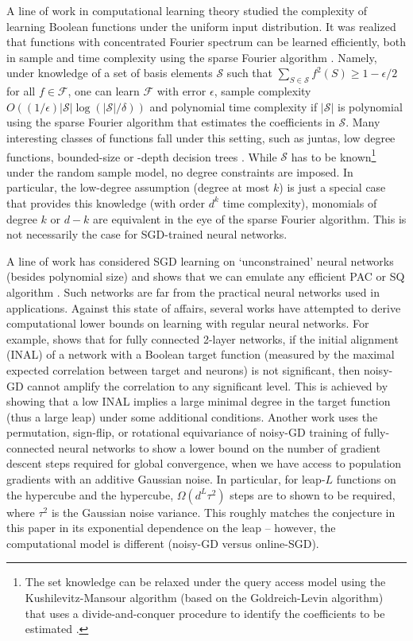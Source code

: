 \documentclass[11pt]{article}
\newcommand{\<}{\langle}
\renewcommand{\>}{\rangle}
\theoremstyle{definition}
\begin{document}
A line of work in computational learning theory studied the complexity of learning Boolean functions under the uniform input distribution. It was realized that functions with concentrated Fourier spectrum can be learned efficiently, both in sample and time complexity using the sparse Fourier algorithm \citep{mansour1994}. Namely, under knowledge of a set of basis elements $\mathcal{S}$ such that $\sum_{S \in \mathcal{S}} f^2(S) \ge 1-\epsilon/2$ for all $f \in \mathcal{F}$, one can learn $\mathcal{F}$ with error $\epsilon$, sample complexity $O((1/\epsilon)|\mathcal{S}|\log (|\mathcal{S}|/\delta))$ and polynomial time complexity if $|\mathcal{S}|$ is polynomial using the sparse Fourier algorithm that estimates the coefficients in $\mathcal{S}$. Many interesting classes of functions fall under this setting, such as juntas, low degree functions, bounded-size or -depth decision trees \citep{odonnell_2014}.  While $\mathcal{S}$ has to be known\footnote{The set knowledge can be relaxed under the query access model using the Kushilevitz-Mansour algorithm (based on the Goldreich-Levin algorithm) that uses a divide-and-conquer procedure to identify the coefficients to be estimated \cite{Kushilevitz-Mansour,GL}.} under the random sample model, no degree constraints are imposed. In particular, the low-degree assumption (degree at most $k$) is just a special case that provides this knowledge (with order $d^k$ time complexity), monomials of degree $k$ or $d-k$ are equivalent in the eye of the sparse Fourier algorithm. This is not necessarily the case for SGD-trained neural networks.




A line of work has considered SGD learning on `unconstrained' neural networks (besides polynomial size) and shows that we can emulate any efficient PAC or SQ algorithm \citep{abbe2020universality,abbe2021power,malach2020implications}. Such networks are far from the practical neural networks used in applications. Against this state of affairs, several works have attempted to derive computational lower bounds on learning with regular neural networks. For example, \cite{inal} shows that for fully connected 2-layer networks, if the initial alignment (INAL) of a network with a Boolean target function     
 (measured by the maximal expected correlation between target and neurons) is not significant, then noisy-GD cannot amplify the correlation to any significant level. This is achieved by showing that a low INAL implies a large minimal degree in the target function (thus a large leap) under some additional conditions. Another work \citep{abbe2022non} uses the permutation, sign-flip, or rotational equivariance of noisy-GD training of fully-connected neural networks to show a lower bound on the number of gradient descent steps required for global convergence, when we have access to population gradients with an additive Gaussian noise. In particular, for leap-$L$ functions on the hypercube and the hypercube, $\Omega (d^{L} \tau^2)$ steps are to shown to be required, where $\tau^2$ is the Gaussian noise variance. This roughly matches the conjecture in this paper in its exponential dependence on the leap -- however, the computational model is different (noisy-GD versus online-SGD).
\end{document}
